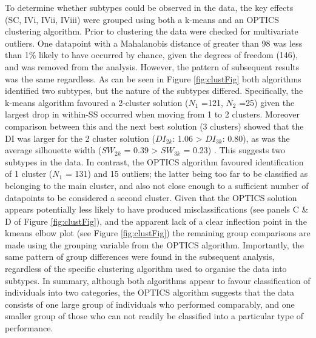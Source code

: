 \documentclass[11pt,halfline,a4paper,]{ouparticle}
\begin{document}
To determine whether subtypes could be observed in the data, the key effects (SC, IVi, IVii, IViii) were grouped using both a k-means and an OPTICS clustering algorithm. Prior to clustering the data were checked for multivariate outliers. One datapoint with a Mahalanobis distance of greater than 98 was less than 1\% likely to have occurred by chance, given the degrees of freedom (146), and was removed from the analysis. However, the pattern of subsequent results was the same regardless. As can be seen in Figure \ref{fig:clustFig} both algorithms identified two subtypes, but the nature of the subtypes differed. Specifically, the k-means algorithm favoured a 2-cluster solution (\(N_{1}\) =121, \(N_{2}\) =25) given the largest drop in within-SS occurred when moving from 1 to 2 clusters. Moreover comparison between this and the next best solution (3 clusters) showed that the DI was larger for the 2 cluster solution (\(DI_{2k}\): 1.06 \textgreater{} \(DI_{3k}\): 0.80), as was the average silhouette width (\(SW_{2k}\) = 0.39 \textgreater{} \(SW_{3k}\) = 0.23) . This suggests two subtypes in the data. In contrast, the OPTICS algorithm favoured identification of 1 cluster (\(N_{1}\) = 131) and 15 outliers; the latter being too far to be classified as belonging to the main cluster, and also not close enough to a sufficient number of datapoints to be considered a second cluster. Given that the OPTICS solution appears potentially less likely to have produced misclassifications (see panels C \& D of Figure \ref{fig:clustFig}), and the apparent lack of a clear inflection point in the kmeans elbow plot (see Figure \ref{fig:clustFig}) the remaining group comparisons are made using the grouping variable from the OPTICS algorithm. Importantly, the same pattern of group differences were found in the subsequent analysis, regardless of the specific clustering algorithm used to organise the data into subtypes. In summary, although both algorithms appear to favour classification of individuals into two categories, the OPTICS algorithm suggests that the data consists of one large group of individuals who performed comparably, and one smaller group of those who can not readily be classified into a particular type of performance.
\end{document}
